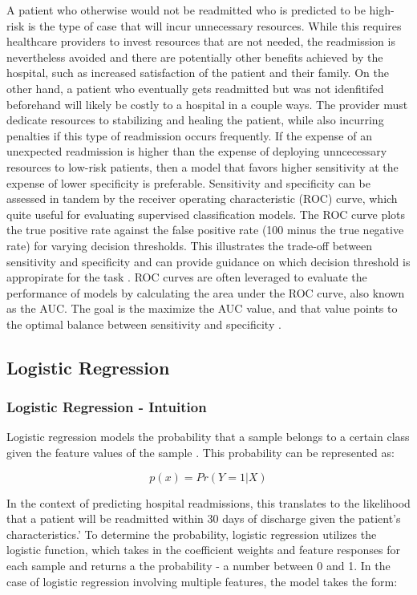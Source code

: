 \documentclass[sigconf]{acmart}
\begin{document}
A patient who otherwise would not be readmitted who is predicted to be high-risk is the type of case that will incur unnecessary resources. While this requires healthcare providers to invest resources that are not needed, the readmission is nevertheless avoided and there are potentially other benefits achieved by the hospital, such as increased satisfaction of the patient and their family. On the other hand, a patient who eventually gets readmitted but was not idenfitifed beforehand will likely be costly to a hospital in a couple ways. The provider must dedicate resources to stabilizing and healing the patient, while also incurring penalties if this type of readmission occurs frequently. If the expense of an unexpected readmission is higher than the expense of deploying unncecessary resources to low-risk patients, then a model that favors higher sensitivity at the expense of lower specificity is preferable.
Sensitivity and specificity can be assessed in tandem by the receiver operating characteristic (ROC) curve, which quite useful for evaluating supervised classification models. The ROC curve plots the true positive rate against the false positive rate (100 minus the true negative rate) for varying decision thresholds. This illustrates the trade-off between sensitivity and specificity and can provide guidance on which decision threshold is appropirate for the task \cite{cite12}. ROC curves are often leveraged to evaluate the performance of models by calculating the area under the ROC curve, also known as the AUC. The goal is the maximize the AUC value, and that value points to the optimal balance between sensitivity and specificity \cite{cite12}.

\subsection{Logistic Regression}

\subsubsection{Logistic Regression - Intuition}

Logistic regression models the probability that a sample belongs to a certain class given the feature values of the sample \cite{cite08}. This probability can be represented as:

\[p(x) = Pr(Y = 1 | X)\]

In the context of predicting hospital readmissions, this translates to the likelihood that a patient will be readmitted within 30 days of discharge given the patient's characteristics.' To determine the probability, logistic regression utilizes the logistic function, which takes in the coefficient weights and feature responses for each sample and returns a the probability - a number between 0 and 1\cite{cite08}. In the case of logistic regression involving multiple features, the model takes the form:
\end{document}
